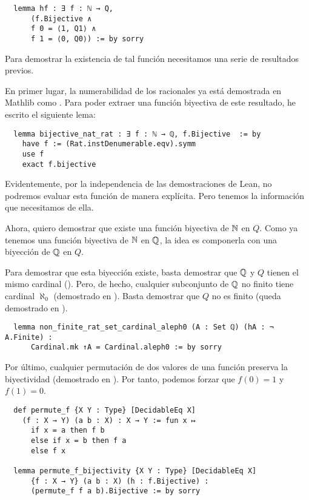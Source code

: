 \begin{lstlisting}
  lemma hf : ∃ f : ℕ → Q,
      (f.Bijective ∧
      f 0 = ⟨1, Q1⟩ ∧
      f 1 = ⟨0, Q0⟩) := by sorry
\end{lstlisting}

Para demostrar la existencia de tal función necesitamos una serie de resultados previos.

En primer lugar, la numerabilidad de los racionales ya está demostrada en Mathlib como . Para poder extraer una función biyectiva de este resultado, he escrito el siguiente lema:

\begin{lstlisting}
  lemma bijective_nat_rat : ∃ f : ℕ → ℚ, f.Bijective  := by
    have f := (Rat.instDenumerable.eqv).symm
    use f
    exact f.bijective
\end{lstlisting}

Evidentemente, por la independencia de las demostraciones de Lean, no podremos evaluar esta función de manera explícita. Pero tenemos la información que necesitamos de ella.

Ahora, quiero demostrar que existe una función biyectiva de $\mathbb{N}$ en $Q$. Como ya tenemos una función biyectiva de $\mathbb{N}$ en $\mathbb{Q}$, la idea es componerla con una biyección de $\mathbb{Q}$ en $Q$.

Para demostrar que esta biyección existe, basta demostrar que $\mathbb{Q}$ y $Q$ tienen el mismo cardinal (). Pero, de hecho, cualquier subconjunto de $\mathbb{Q}$ no finito tiene cardinal $\aleph_0$ (demostrado en ). Basta demostrar que $Q$ no es finito (queda demostrado en ).

\begin{lstlisting}
  lemma non_finite_rat_set_cardinal_aleph0 (A : Set ℚ) (hA : ¬ A.Finite) :
      Cardinal.mk ↑A = Cardinal.aleph0 := by sorry
\end{lstlisting}

Por último, cualquier permutación de dos valores de una función preserva la biyectividad (demostrado en ). Por tanto, podemos forzar que $f(0) = 1$ y $f(1) = 0$.

\begin{lstlisting}
  def permute_f {X Y : Type} [DecidableEq X]
    (f : X → Y) (a b : X) : X → Y := fun x ↦
      if x = a then f b
      else if x = b then f a
      else f x

  lemma permute_f_bijectivity {X Y : Type} [DecidableEq X]
      {f : X → Y} (a b : X) (h : f.Bijective) :
      (permute_f f a b).Bijective := by sorry
\end{lstlisting}

